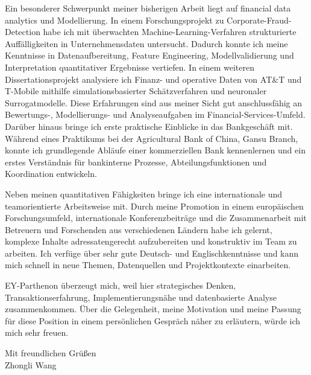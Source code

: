 \documentclass[11pt]{article}
\begin{document}
Ein besonderer Schwerpunkt meiner bisherigen Arbeit liegt auf financial data analytics und Modellierung. In einem Forschungsprojekt zu Corporate-Fraud-Detection habe ich mit \"uberwachten Machine-Learning-Verfahren strukturierte Auff\"alligkeiten in Unternehmensdaten untersucht. Dadurch konnte ich meine Kenntnisse in Datenaufbereitung, Feature Engineering, Modellvalidierung und Interpretation quantitativer Ergebnisse vertiefen. In einem weiteren Dissertationsprojekt analysiere ich Finanz- und operative Daten von AT\&T und T-Mobile mithilfe simulationsbasierter Sch\"atzverfahren und neuronaler Surrogatmodelle. Diese Erfahrungen sind aus meiner Sicht gut anschlussf\"ahig an Bewertungs-, Modellierungs- und Analyseaufgaben im Financial-Services-Umfeld.
Dar\"uber hinaus bringe ich erste praktische Einblicke in das Bankgesch\"aft mit. 
W\"ahrend eines Praktikums bei der Agricultural Bank of China, Gansu Branch, konnte ich grundlegende Abl\"aufe einer kommerziellen Bank kennenlernen und ein erstes Verst\"andnis f\"ur bankinterne Prozesse, Abteilungsfunktionen und Koordination entwickeln. 

Neben meinen quantitativen F\"ahigkeiten bringe ich eine internationale und teamorientierte Arbeitsweise mit. Durch meine Promotion in einem europ\"aischen Forschungsumfeld, internationale Konferenzbeitr\"age und die Zusammenarbeit mit Betreuern und Forschenden aus verschiedenen L\"andern habe ich gelernt, komplexe Inhalte adressatengerecht aufzubereiten und konstruktiv im Team zu arbeiten. Ich verf\"uge \"uber sehr gute Deutsch- und Englischkenntnisse und kann mich schnell in neue Themen, Datenquellen und Projektkontexte einarbeiten.

EY-Parthenon \"uberzeugt mich, weil hier strategisches Denken, Transaktionserfahrung, Implementierungsn\"ahe und datenbasierte Analyse zusammenkommen. \"Uber die Gelegenheit, meine Motivation und meine Passung f\"ur diese Position in einem pers\"onlichen Gespr\"ach n\"aher zu erl\"autern, w\"urde ich mich sehr freuen.

\vspace{0.15cm}

\noindent Mit freundlichen Gr\"u{\ss}en \\[0.5cm]
\noindent Zhongli Wang
\end{document}
